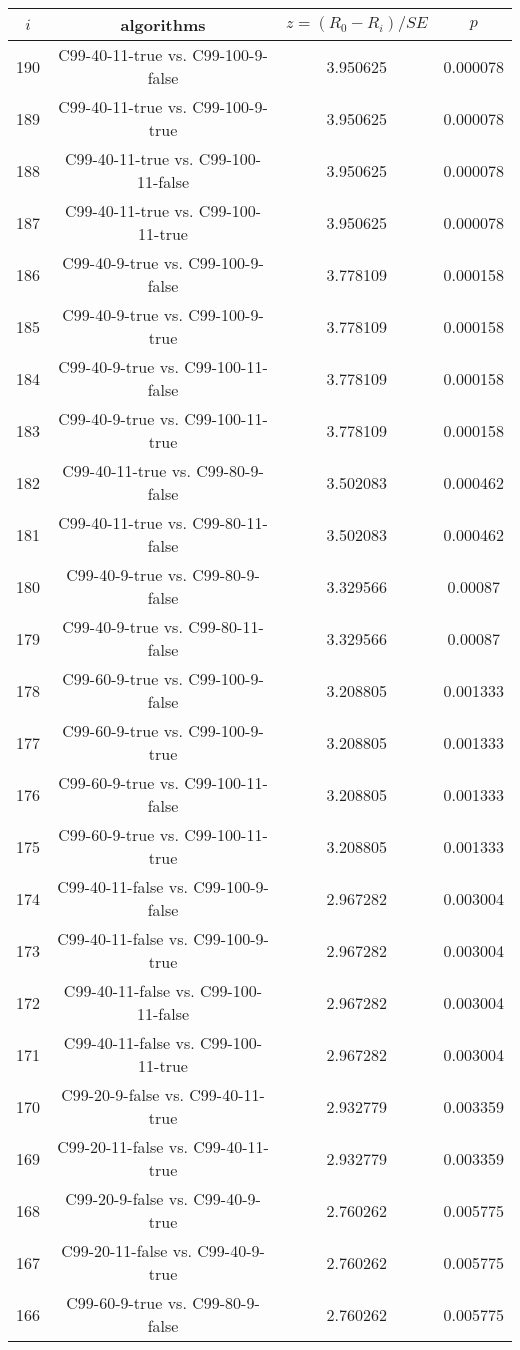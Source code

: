 \documentclass[a4paper,10pt]{article}
\begin{document}
\begin{landscape}
\begin{table}[!htp]
\centering\scriptsize
\begin{tabular}{cccc}
$i$&algorithms&$z=(R_0 - R_i)/SE$&$p$\\
\hline190&C99-40-11-true vs. C99-100-9-false&3.950625&0.000078\\
189&C99-40-11-true vs. C99-100-9-true&3.950625&0.000078\\
188&C99-40-11-true vs. C99-100-11-false&3.950625&0.000078\\
187&C99-40-11-true vs. C99-100-11-true&3.950625&0.000078\\
186&C99-40-9-true vs. C99-100-9-false&3.778109&0.000158\\
185&C99-40-9-true vs. C99-100-9-true&3.778109&0.000158\\
184&C99-40-9-true vs. C99-100-11-false&3.778109&0.000158\\
183&C99-40-9-true vs. C99-100-11-true&3.778109&0.000158\\
182&C99-40-11-true vs. C99-80-9-false&3.502083&0.000462\\
181&C99-40-11-true vs. C99-80-11-false&3.502083&0.000462\\
180&C99-40-9-true vs. C99-80-9-false&3.329566&0.00087\\
179&C99-40-9-true vs. C99-80-11-false&3.329566&0.00087\\
178&C99-60-9-true vs. C99-100-9-false&3.208805&0.001333\\
177&C99-60-9-true vs. C99-100-9-true&3.208805&0.001333\\
176&C99-60-9-true vs. C99-100-11-false&3.208805&0.001333\\
175&C99-60-9-true vs. C99-100-11-true&3.208805&0.001333\\
174&C99-40-11-false vs. C99-100-9-false&2.967282&0.003004\\
173&C99-40-11-false vs. C99-100-9-true&2.967282&0.003004\\
172&C99-40-11-false vs. C99-100-11-false&2.967282&0.003004\\
171&C99-40-11-false vs. C99-100-11-true&2.967282&0.003004\\
170&C99-20-9-false vs. C99-40-11-true&2.932779&0.003359\\
169&C99-20-11-false vs. C99-40-11-true&2.932779&0.003359\\
168&C99-20-9-false vs. C99-40-9-true&2.760262&0.005775\\
167&C99-20-11-false vs. C99-40-9-true&2.760262&0.005775\\
166&C99-60-9-true vs. C99-80-9-false&2.760262&0.005775\\

\end{tabular}
\end{table}
\end{landscape}
\end{document}
